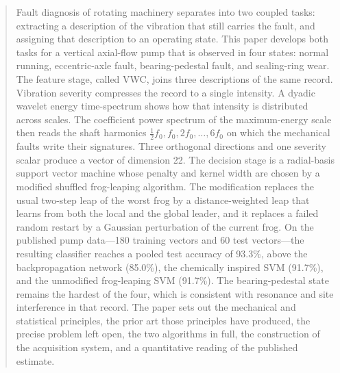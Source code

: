 \documentclass[12pt,a4paper]{report}
\begin{document}
\vspace{1.2em}
\begin{abstract}
\noindent
Fault diagnosis of rotating machinery separates into two coupled tasks: extracting a description of the vibration that still carries the fault, and assigning that description to an operating state.
This paper develops both tasks for a vertical axial-flow pump that is observed in four states: normal running, eccentric-axle fault, bearing-pedestal fault, and sealing-ring wear.
The feature stage, called VWC, joins three descriptions of the same record.
Vibration severity compresses the record to a single intensity.
A dyadic wavelet energy time-spectrum shows how that intensity is distributed across scales.
The coefficient power spectrum of the maximum-energy scale then reads the shaft harmonics \(\tfrac12 f_0, f_0, 2f_0, \ldots, 6f_0\) on which the mechanical faults write their signatures.
Three orthogonal directions and one severity scalar produce a vector of dimension 22.
The decision stage is a radial-basis support vector machine whose penalty and kernel width are chosen by a modified shuffled frog-leaping algorithm.
The modification replaces the usual two-step leap of the worst frog by a distance-weighted leap that learns from both the local and the global leader, and it replaces a failed random restart by a Gaussian perturbation of the current frog.
On the published pump data---180 training vectors and 60 test vectors---the resulting classifier reaches a pooled test accuracy of 93.3\%, above the backpropagation network (85.0\%), the chemically inspired SVM (91.7\%), and the unmodified frog-leaping SVM (91.7\%).
The bearing-pedestal state remains the hardest of the four, which is consistent with resonance and site interference in that record.
The paper sets out the mechanical and statistical principles, the prior art those principles have produced, the precise problem left open, the two algorithms in full, the construction of the acquisition system, and a quantitative reading of the published estimate.
\end{abstract}

\tableofcontents
\listoffigures
\listoftables





\end{document}
